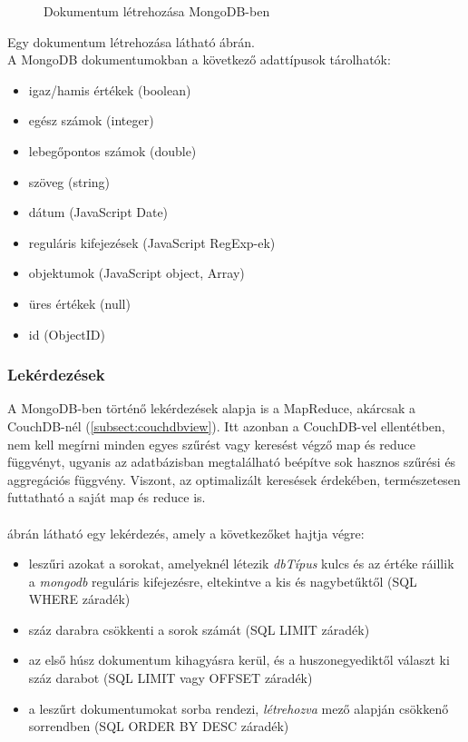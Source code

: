 			\begin{figure}[ht]
				\centering
					
					\caption{Dokumentum létrehozása MongoDB-ben}
					\label{fig:mongodbcreatedoc}
			\end{figure}
			\newpage
			\flushleft
			Egy dokumentum létrehozása látható  ábrán. \\
			A MongoDB dokumentumokban a következő adattípusok tárolhatók:
			\begin{itemize}
				\item igaz/hamis értékek (boolean)
				\item egész számok (integer)
				\item lebegőpontos számok (double)
				\item szöveg (string)
				\item dátum (JavaScript Date)
				\item reguláris kifejezések (JavaScript RegExp-ek)
				\item objektumok (JavaScript object, Array)
				\item üres értékek (null)
				\item id (ObjectID)
			\end{itemize}
		\subsubsection{Lekérdezések}
			A MongoDB-ben történő lekérdezések alapja is a MapReduce, akárcsak a CouchDB-nél (\ref{subsect:couchdbview}). Itt azonban a CouchDB-vel ellentétben, nem kell megírni minden egyes szűrést vagy keresést végző map és reduce függvényt, ugyanis az adatbázisban megtalálható beépítve sok hasznos szűrési és aggregációs függvény. Viszont, az optimalizált keresések érdekében, természetesen futtatható a saját map és reduce is. \\
			\hfill\\
			 ábrán látható egy lekérdezés, amely a következőket hajtja végre:
			\begin{itemize}
				\item leszűri azokat a sorokat, amelyeknél létezik \emph{dbTípus} kulcs és az értéke ráillik a \emph{mongodb} reguláris kifejezésre,  eltekintve a kis és nagybetűktől (SQL WHERE záradék)
				\item száz darabra csökkenti a sorok számát (SQL LIMIT záradék)
				\item az első húsz dokumentum kihagyásra kerül, és a huszonegyediktől választ ki száz darabot (SQL LIMIT vagy OFFSET záradék)
				\item a leszűrt dokumentumokat sorba rendezi, \emph{létrehozva} mező alapján csökkenő sorrendben (SQL ORDER BY DESC záradék)
			\end{itemize}
			
